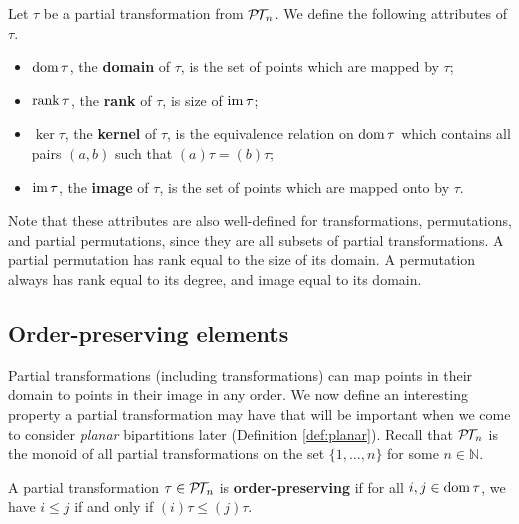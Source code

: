 \begin{definition}
  Let $\tau$ be a partial transformation from $\mathcal{P\!T\!}_n$.  We define the following
  attributes of $\tau$.
  \begin{itemize}
  \item $\operatorname{dom} \tau$, the \textbf{domain} of $\tau$, is the set of points which
    are mapped by $\tau$;
  \item $\operatorname{rank} \tau$, the \textbf{rank} of $\tau$, is size of $\operatorname{im} \tau$;
  \item $\ker \tau$, the \textbf{kernel} of $\tau$, is the equivalence relation
    on $\operatorname{dom} \tau$ which contains all pairs $(a,b)$ such that
    $(a)\tau = (b)\tau$;
  \item $\operatorname{im} \tau$, the \textbf{image} of $\tau$, is the set of points which are
    mapped onto by $\tau$.
  \end{itemize}
\end{definition}

Note that these attributes are also well-defined for transformations,
permutations, and partial permutations, since they are all subsets of partial
transformations.  A partial permutation has rank equal to the size of its
domain.  A permutation always has rank equal to its degree, and image equal to
its domain.

\subsection{Order-preserving elements}
\label{sec:order-preserving}

Partial transformations (including transformations) can map points in their
domain to points in their image in any order.  We now define an interesting
property a partial transformation may have that will be important when we come
to consider \textit{planar} bipartitions later (Definition \ref{def:planar}).
Recall that $\mathcal{P\!T\!}_n$ is the monoid of all partial transformations on the set
$\{1, \ldots, n\}$ for some $n \in \mathbb{N}$.

\begin{definition}
  \label{def:order-preserving}
  A partial transformation $\tau \in \mathcal{P\!T\!}_n$ is \textbf{order-preserving} if for all
  $i,j \in \operatorname{dom}\tau$, we have $i \leq j$ if and only if $(i)\tau \leq (j)\tau$.
\end{definition}

